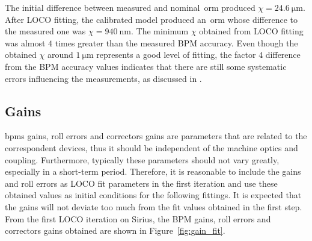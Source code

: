 The initial difference between measured and nominal~\gls{orm} produced $\chi = \SI{24.6}{\micro\meter}$. After LOCO fitting, the calibrated model produced an~\gls{orm} whose difference to the measured one was $\chi = \SI{940}{\nano\meter}$. The minimum $\chi$ obtained from LOCO fitting was almost $4$ times greater than the measured BPM accuracy. Even though the obtained $\chi$ around $\SI{1}{\micro\meter}$ represents a good level of fitting, the factor $4$ difference from the BPM accuracy values indicates that there are still some systematic errors influencing the measurements, as discussed in \cite{safranek1995}.

\subsection{Gains}
\glspl{bpm} gains, roll errors and correctors gains are parameters that are related to the correspondent devices, thus it should be independent of the machine optics and coupling. Furthermore, typically these parameters should not vary greatly, especially in a short-term period. Therefore, it is reasonable to include the gains and roll errors as LOCO fit parameters in the first iteration and use these obtained values as initial conditions for the following fittings. It is expected that the gains will not deviate too much from the fit values obtained in the first step. From the first LOCO iteration on Sirius, the BPM gains, roll errors and correctors gains obtained are shown in Figure~\ref{fig:gain_fit}.
